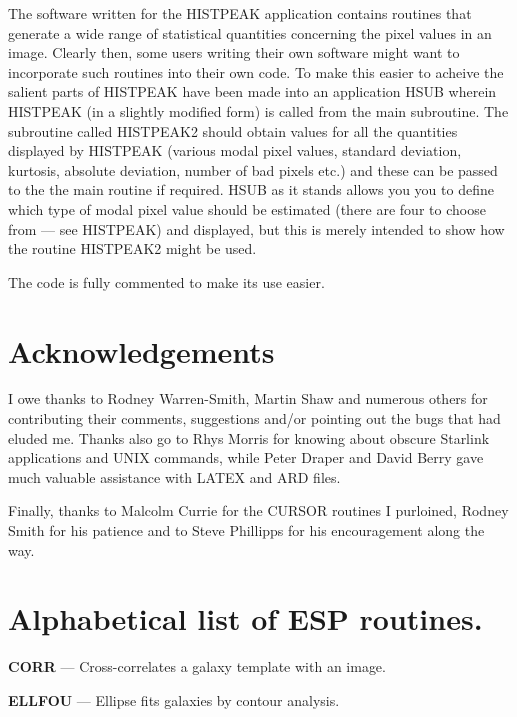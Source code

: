 \documentclass[twoside,11pt]{starlink}
\begin{document}
The software written for the HISTPEAK application contains routines that generate
a wide range of statistical quantities concerning the pixel values in
an image. Clearly then, some users writing their own software might want to
incorporate such routines into their own code. To make this easier to acheive
the salient parts of HISTPEAK have been made into an application HSUB wherein
HISTPEAK (in a slightly modified form) is called from the main subroutine.
The subroutine called HISTPEAK2 should obtain values for all the
quantities displayed by HISTPEAK (various modal pixel values, standard
deviation, kurtosis, absolute deviation, number of bad pixels etc.) and these
can be passed to the the main routine if required. HSUB as it stands allows you
you to define which type of modal pixel value should be estimated
(there are four to choose from --- see HISTPEAK) and displayed, but this
is merely intended to show how the routine HISTPEAK2 might be used.

The code is fully commented to make its use easier.


\section{Acknowledgements}
\label{sec:acknowledgements}

I owe thanks to Rodney Warren-Smith, Martin Shaw and numerous others for
contributing their comments, suggestions and/or pointing out the bugs that had
eluded me. Thanks also go to Rhys Morris for knowing about obscure Starlink
applications and UNIX commands, while Peter Draper  and David Berry gave
much valuable assistance with LATEX and ARD files.

Finally, thanks to Malcolm Currie for the  CURSOR routines I purloined,
Rodney Smith for his patience and to Steve Phillipps for his encouragement
along the way.

\newpage
\appendix

\newpage

\section{Alphabetical list of ESP routines.}
\label{app:alphabetical}

%
%
\textbf{CORR}{ --- Cross-correlates a galaxy template with an image.}
\pageref{des:CORR}

\textbf{ELLFOU}{ --- Ellipse fits galaxies by contour analysis.}
\pageref{des:ELLFOU}
\end{document}
